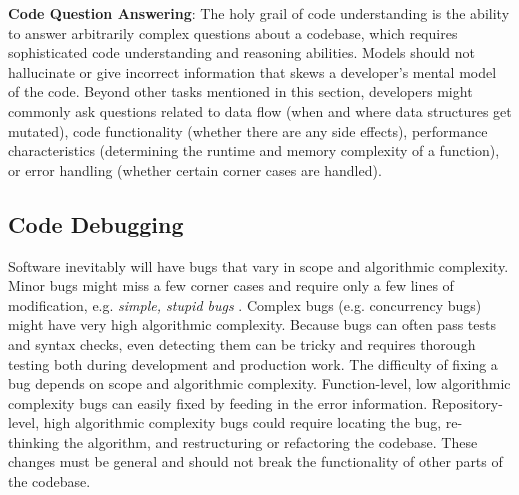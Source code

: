 
\textbf{Code Question Answering}: The holy grail of code understanding is the ability to answer arbitrarily complex questions about a codebase, which requires sophisticated code understanding and reasoning abilities. Models should not hallucinate or give incorrect information that skews a developer's mental model of the code. Beyond other tasks mentioned in this section, developers might commonly ask questions related to data flow (when and where data structures get mutated), code functionality (whether there are any side effects), performance characteristics (determining the runtime and memory complexity of a function), or error handling (whether certain corner cases are handled). 

\vspace{-0.25cm}

\subsection{Code Debugging}

\vspace{-0.1cm}

Software inevitably will have bugs that vary in scope and algorithmic complexity. Minor bugs might miss a few corner cases and require only a few lines of modification, e.g. \textit{simple, stupid bugs} \citep{mosolygo2021rise}. Complex bugs (e.g. concurrency bugs) might have very high algorithmic complexity. Because bugs can often pass tests and syntax checks, even detecting them can be tricky and requires thorough testing both during development and production work. The difficulty of fixing a bug depends on scope and algorithmic complexity. Function-level, low algorithmic complexity bugs can easily fixed by feeding in the error information. Repository-level, high algorithmic complexity bugs could require locating the bug, re-thinking the algorithm, and restructuring or refactoring the codebase. These changes must be general and should not break the functionality of other parts of the codebase.


